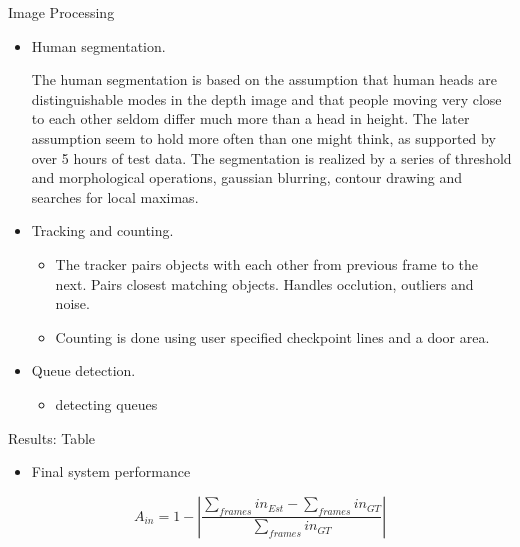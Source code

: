 \documentclass[final,hyperref={pdfpagelabels=false}]{beamer}
\begin{document}
\begin{frame}[t]
\begin{columns}[t]
\begin{column}{.465\textwidth}
\begin{block}{Image Processing}

\begin{itemize}
\item Human segmentation.
\begin{itemize}
The human segmentation is based on the assumption that human heads are distinguishable modes in the depth image and that people moving very close to each other seldom differ much more than a head in height. The later assumption seem to hold more often than one might think, as supported by over 5 hours of test data. The segmentation is realized by a series of threshold and morphological operations, gaussian blurring, contour drawing and searches for local maximas. 
\end{itemize}
\item Tracking and counting.
\begin{itemize}
\item{The tracker pairs objects with each other from previous frame to the next. Pairs closest matching objects. Handles occlution, outliers and noise.}
\item{Counting is done using user specified checkpoint lines and a door area.}
\end{itemize}
\item Queue detection.
\begin{itemize}
\item{detecting queues}
\end{itemize}
\end{itemize}

\end{block}






\begin{block}{Results: Table}

\begin{itemize}
\item Final system performance
\end{itemize}

\begin{equation}
\label{eq:in_accuracy}
A_{in} = 1 - |\frac{\sum_{frames}{in_{Est}}-\sum_{frames}{in_{GT}}}{\sum_{frames}in_{GT}}|
\end{equation} 


\end{block}
\end{column}
\end{columns}
\end{frame}
\end{document}
